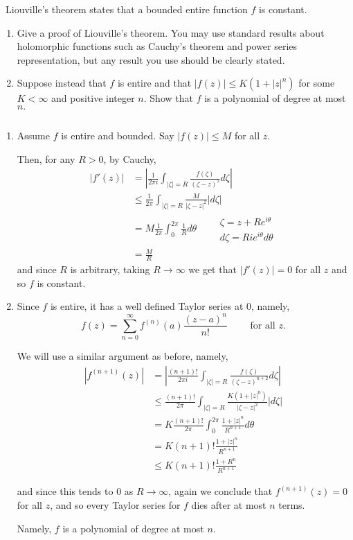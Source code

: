 \documentclass[12pt]{Qual}
\begin{document}
\begin{problem} $\,$ Liouville's theorem states that a bounded entire function $f$ is constant.
\begin{enumerate}[label=(\alph*)]
    \item Give a proof of Liouville's theorem. You may use standard results about holomorphic functions such as Cauchy's theorem and power series representation, but any result you use should be clearly stated.
    \item Suppose instead that $f$ is entire and that $|f(z)|\le K(1+|z|^n)$ for some $K<\infty$ and positive integer $n.$ Show that $f$ is a polynomial of degree at most $n.$
\end{enumerate}
\end{problem}


\begin{solution}$\,$
\begin{enumerate}[label=(\alph*)]
    \item Assume $f$ is entire and bounded. Say $|f(z)|\le M$ for all $z.$

    Then, for any $R>0$, by Cauchy, \begin{align*}
        |f'(z)|&=\left|\frac{1}{2\pi i}\int_{|\zeta|=R}\frac{f(\zeta)}{(\zeta-z)^2}d\zeta\right|\\
        &\le \frac{1}{2\pi}\int_{|\zeta|=R}\frac{M}{|\zeta-z|^2}|d\zeta|\\
        &=M\frac{1}{2\pi}\int_0^{2\pi}\frac{1}{R}d\theta \qquad \begin{matrix}
        \zeta= z+Re^{i\theta}\\
        d\zeta = Rie^{i\theta}d\theta
        \end{matrix}\\
        &=\frac{M}{R}
    \end{align*} and since $R$ is arbitrary, taking $R\to\infty$ we get that $|f'(z)|=0$ for all $z$ and so $f$ is constant.
    \item Since $f$ is entire, it has a well defined Taylor series at $0$, namely, $$f(z)=\sum_{n=0}^\infty f^{(n)}(a)\frac{(z-a)^n}{n!}\qquad\text{ for all }z.$$

    We will use a similar argument as before, namely, \begin{align*}
        |f^{(n+1)}(z)|&=\left|\frac{(n+1)!}{2\pi i}\int_{|\zeta|=R}\frac{f(\zeta)}{(\zeta-z)^{n+2}}d\zeta\right|\\
        &\le \frac{(n+1)!}{2\pi}\int_{|\zeta|=R}\frac{K(1+|z|^n)}{|\zeta-z|^2}|d\zeta|\\
        &=K\frac{(n+1)!}{2\pi}\int_0^{2\pi}\frac{1+|z|^n}{R^{n+1}}d\theta\\
        &=K(n+1)!\frac{1+|z|^n}{R^{n+1}}\\
        &\le K(n+1)!\frac{1+R^n}{R^{n+1}}
    \end{align*}

    and since this tends to $0$ as $R\to\infty$, again we conclude that $f^{(n+1)}(z)=0$ for all $z$, and so every Taylor series for $f$ dies after at most $n$ terms.

    Namely, $f$ is a polynomial of degree at most $n.$
\end{enumerate}
\end{solution}
\end{document}
